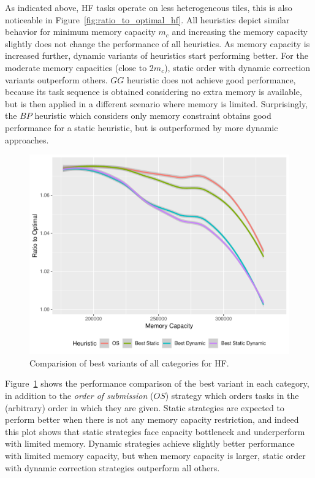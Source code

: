 \documentclass[sigconf]{acmart}
\begin{document}
{		As indicated above, HF tasks operate on less heterogeneous tiles, this is also noticeable in Figure~\ref{fig:ratio_to_optimal_hf}. All heuristics depict similar behavior for minimum memory capacity $m_c$ and increasing the memory capacity slightly does not change the performance of all heuristics. As memory capacity is increased further, dynamic variants of heuristics start performing better. For the moderate memory capacities (close to $2m_c$), static order with dynamic correction variants outperform others. $GG$ heuristic does not achieve good performance, because its task sequence is obtained considering no extra memory is available, but is then applied in a different scenario where memory is limited. Surprisingly, the $BP$ heuristic which considers only memory constraint obtains good performance for a static heuristic, but is outperformed by more dynamic approaches.
		
		\begin{figure}[htb]
			\includegraphics[scale=0.5]{./results/plots/ratio_to_optimal_hf-best.pdf}
			\caption{Comparision of best variants of all categories for HF.}
			\label{fig:ratio_to_optimal_best_hf}
		\end{figure}
		
		
		Figure~\ref{fig:ratio_to_optimal_best_hf} shows the performance comparison of the best variant in each category, in addition to the \textit{order of submission} ($OS$) strategy which orders tasks in the (arbitrary) order in which they are given. Static strategies are expected to perform better when there is not any memory capacity restriction, and indeed this plot shows that static strategies face capacity bottleneck and underperform with limited memory. Dynamic strategies achieve slightly better performance with limited memory capacity, but when memory capacity is larger, static order with dynamic correction strategies outperform all others.
		
}
\end{document}

